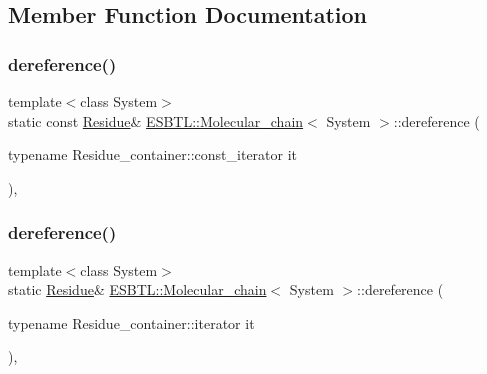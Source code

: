 \subsection{Member Function Documentation}
\mbox{\label{classESBTL_1_1Molecular__chain_a8b33c52b188ce7704ffd12bdbdf13d68}} 
\subsubsection{\texorpdfstring{dereference()}{dereference()}\hspace{0.1cm}{\footnotesize\ttfamily [1/2]}}
{\footnotesize\ttfamily template$<$class System$>$ \\
static const \hyperlink{classESBTL_1_1Molecular__chain_a59b61e0ecde5fb4c3d1765a37c9cf6cb}{Residue}\& \hyperlink{classESBTL_1_1Molecular__chain}{E\+S\+B\+T\+L\+::\+Molecular\+\_\+chain}$<$ System $>$\+::dereference (\begin{DoxyParamCaption}\item[{typename Residue\+\_\+container\+::const\+\_\+iterator}]{it }\end{DoxyParamCaption})\hspace{0.3cm}{\ttfamily [inline]}, {\ttfamily [static]}}

\mbox{\label{classESBTL_1_1Molecular__chain_a82c1f1ae170646c483eba1cbaae17419}} 
\subsubsection{\texorpdfstring{dereference()}{dereference()}\hspace{0.1cm}{\footnotesize\ttfamily [2/2]}}
{\footnotesize\ttfamily template$<$class System$>$ \\
static \hyperlink{classESBTL_1_1Molecular__chain_a59b61e0ecde5fb4c3d1765a37c9cf6cb}{Residue}\& \hyperlink{classESBTL_1_1Molecular__chain}{E\+S\+B\+T\+L\+::\+Molecular\+\_\+chain}$<$ System $>$\+::dereference (\begin{DoxyParamCaption}\item[{typename Residue\+\_\+container\+::iterator}]{it }\end{DoxyParamCaption})\hspace{0.3cm}{\ttfamily [inline]}, {\ttfamily [static]}}

